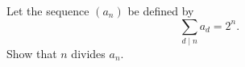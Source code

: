 Let the sequence $(a_n)$ be defined by
\[
\sum_{d \mid n} a_d = 2^n.
\]
Show that $n$ divides $a_n$.
